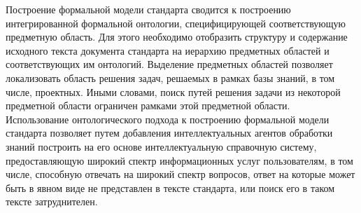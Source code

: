 \begin{SCn}
\begin{scnsubstruct}
\begin{scnindent}
{        	Построение формальной модели стандарта сводится к построению интегрированной формальной онтологии, специфицирующей соответствующую предметную область. Для этого необходимо отобразить структуру и содержание исходного текста документа стандарта на иерархию предметных областей и соответствующих им онтологий. Выделение предметных областей позволяет локализовать область решения задач, решаемых в рамках базы знаний, в том числе, проектных. Иными словами, поиск путей решения задачи из некоторой предметной области ограничен рамками этой предметной области.\\
        	Использование онтологического подхода к построению формальной модели стандарта позволяет путем добавления интеллектуальных агентов обработки знаний построить на его основе интеллектуальную справочную систему, предоставляющую широкий спектр информационных услуг пользователям, в том числе, способную отвечать на широкий спектр вопросов, ответ на которые может быть в явном виде не представлен в тексте стандарта, или поиск его в таком тексте затруднителен.}
        \end{scnindent}
        

\end{scnsubstruct}
\end{SCn}
